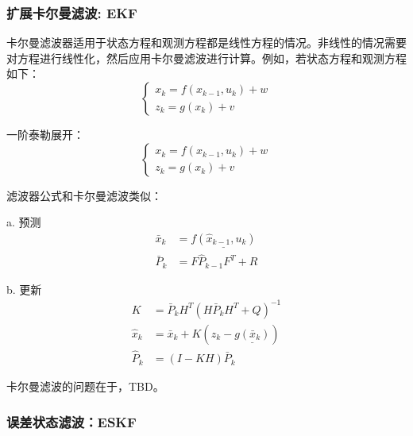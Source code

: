 \subsubsection{扩展卡尔曼滤波: EKF}
\par 卡尔曼滤波器适用于状态方程和观测方程都是线性方程的情况。非线性的情况需要对方程进行线性化，然后应用卡尔曼滤波进行计算。例如，若状态方程和观测方程如下：
\begin{equation}
	\left\{
	\begin{array}{lr}
		x_k = f(x_{k-1}, u_k) + w \\
		z_k = g(x_k) + v
	\end{array}
	\right.
\end{equation}
\par 一阶泰勒展开：
\begin{equation}
	\left\{
	\begin{array}{lr}
		x_k = f(x_{k-1}, u_k) + w \\
		z_k = g(x_k) + v
	\end{array}
	\right.
\end{equation}
\par 滤波器公式和卡尔曼滤波类似：
\par a. 预测
\begin{equation}
	\begin{split}
		\bar{x}_k&=\underline{f(\hat{x}_{k-1}, u_k)} \\
		\bar{P}_k&=F\hat{P}_{k-1}F^T+R
	\end{split}
\end{equation}
\par b. 更新
\begin{equation}
	\begin{split}
		K&=\bar{P}_k H^T(H \bar{P}_k H^T + Q)^{-1} \\
		\hat{x}_k&=\bar{x}_k+K(z_k-\underline{g(\bar{x}_k)}) \\
		\hat{P}_k&=(I-K H)\bar{P}_k
	\end{split}
\end{equation}
\par 卡尔曼滤波的问题在于，TBD。

\subsubsection{误差状态滤波：ESKF}
